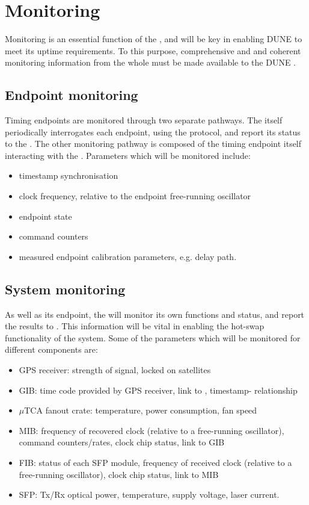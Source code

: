\documentclass{dune}
\begin{document}
\section{Monitoring}
Monitoring is an essential function of the , and will be key in enabling DUNE to meet its uptime requirements. To this purpose, comprehensive and and coherent monitoring information from the whole  must be made available to the DUNE .

\subsection{Endpoint monitoring}
Timing endpoints are monitored through two separate pathways. The  itself periodically interrogates each endpoint, using the  protocol, and report its status to the . The other monitoring pathway is composed of the timing endpoint itself interacting with the . Parameters which will be monitored include:

\begin{itemize}
  \item timestamp synchronisation
  \item clock frequency, relative to the endpoint free-running oscillator
  \item endpoint state
  \item command counters
  \item measured endpoint calibration parameters, e.g. delay path.
\end{itemize}

\subsection{System monitoring}
As well as its endpoint, the  will monitor its own functions and status, and report the results to . This information will be vital in enabling the hot-swap functionality of the system. Some of the parameters which will be monitored for different  components are:

\begin{itemize}
    \item GPS receiver: strength of signal, locked on satellites 
    \item GIB: time code provided by GPS receiver, link to ,  timestamp- relationship
    \item $\mu$TCA fanout crate: temperature, power consumption, fan speed
    \item MIB: frequency of recovered clock (relative to a free-running oscillator), command counters/rates, clock chip status, link to GIB
    \item FIB: status of each SFP module, frequency of received clock (relative to a free-running oscillator), clock chip status, link to MIB
    \item SFP: Tx/Rx optical power, temperature, supply voltage, laser current.  
\end{itemize}
\end{document}
